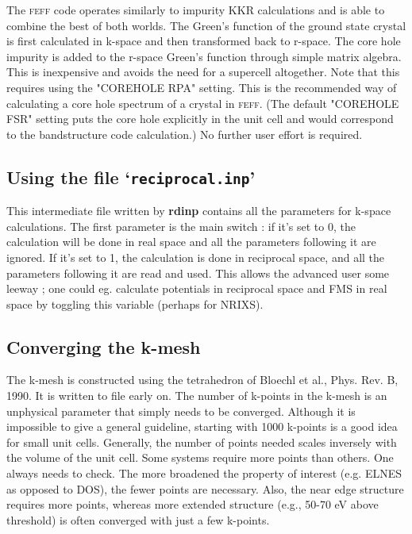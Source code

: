 \documentclass[11pt,oneside]{report} %
\newcommand{\program}[1]{\textsc{#1}}
\newcommand{\feff}{\program{feff}}
\newcommand{\file}[1]{`\texttt{#1}'}
\newcommand{\module}[1]{\textrm{\bf{#1}}}
\begin{document}
The {\feff} code operates similarly to impurity KKR calculations and is able to combine the best of both worlds.  The Green's function of the ground state crystal is first calculated in k-space and then transformed back to r-space.  The core hole impurity is added to the r-space Green's function through simple matrix algebra.  This is inexpensive and avoids the need for a supercell altogether.  Note that this requires using the "COREHOLE RPA" setting.  This is the recommended way of calculating a core hole spectrum of a crystal in {\feff}.  (The default "COREHOLE FSR" setting puts the core hole explicitly in the unit cell and would correspond to the bandstructure code calculation.)  No further user effort is required.



\subsection{Using the file \file{reciprocal.inp}}
This intermediate file written by \module{rdinp} contains all the parameters for k-space calculations.  The first parameter is the main switch : if it's set to 0, the calculation will be done in real space and all the parameters following it are ignored.  If it's set to 1, the calculation is done in reciprocal space, and all the parameters following it are read and used.  This allows the advanced user some leeway ; one could eg. calculate potentials in reciprocal space and FMS in real space by toggling this variable (perhaps for NRIXS).


\subsection{Converging the k-mesh}
The k-mesh is constructed using the tetrahedron of Bloechl et al., Phys. Rev. B, 1990.  It is written to file early on.
The number of k-points in the k-mesh is an unphysical parameter that simply needs to be converged.  Although it is impossible to give a general guideline, starting with 1000 k-points is a good idea for small unit cells.  Generally, the number of points needed scales inversely with the volume of the unit cell.  Some systems require more points than others.  One always needs to check.  The more broadened the property of interest (e.g. ELNES as opposed to DOS), the fewer points are necessary.  Also, the near edge structure requires more points, whereas more extended structure (e.g., 50-70 eV above threshold) is often converged with just a few k-points.
\end{document}
